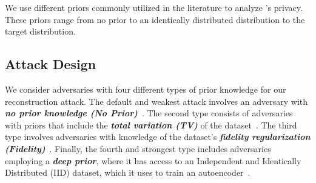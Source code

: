 We use different priors commonly utilized in the literature to analyze \sysname's privacy. These priors range from no prior to an identically distributed distribution to the target distribution. 



\subsection{Attack Design} 
\label{subsec03-02}
We consider adversaries with four different types of prior knowledge for our reconstruction attack. The default and weakest attack involves an adversary with {\it \textbf{no prior knowledge (No Prior)}}~\cite{deepLeakage}. The second type consists of adversaries with priors that include the {\it \textbf{total variation (TV)}} of the dataset~\cite{invertGradiants}. The third type involves adversaries with knowledge of the dataset's {\it \textbf{fidelity regularization (Fidelity)}}~\cite{batchRecovery}. Finally, the fourth and strongest type includes adversaries employing a {\it \textbf{deep prior}}, where it has access to an Independent and Identically Distributed (IID) dataset, which it uses to train an autoencoder~\cite{gradientObfuscation}. 



